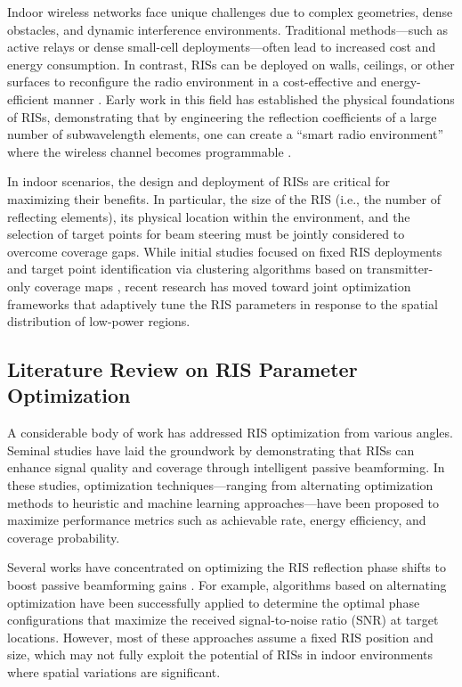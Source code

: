 \documentclass{IEEEoj}
\begin{document}
Indoor wireless networks face unique challenges due to complex geometries, dense obstacles, and dynamic interference environments. Traditional methods—such as active relays or dense small-cell deployments—often lead to increased cost and energy consumption. In contrast, RISs can be deployed on walls, ceilings, or other surfaces to reconfigure the radio environment in a cost-effective and energy-efficient manner \cite{yuan2021reconfigurable, liu2021reconfigurable}. Early work in this field has established the physical foundations of RISs, demonstrating that by engineering the reflection coefficients of a large number of subwavelength elements, one can create a “smart radio environment” where the wireless channel becomes programmable \cite{pan2021reconfigurable}.

In indoor scenarios, the design and deployment of RISs are critical for maximizing their benefits. In particular, the size of the RIS (i.e., the number of reflecting elements), its physical location within the environment, and the selection of target points for beam steering must be jointly considered to overcome coverage gaps. While initial studies focused on fixed RIS deployments and target point identification via clustering algorithms based on transmitter-only coverage maps \cite{emre_claude_eucap_paper}, recent research has moved toward joint optimization frameworks that adaptively tune the RIS parameters in response to the spatial distribution of low-power regions.

\subsection{Literature Review on RIS Parameter Optimization}

A considerable body of work has addressed RIS optimization from various angles. Seminal studies \cite{renzo2020smart, wu2021intelligent} have laid the groundwork by demonstrating that RISs can enhance signal quality and coverage through intelligent passive beamforming. In these studies, optimization techniques—ranging from alternating optimization methods to heuristic and machine learning approaches—have been proposed to maximize performance metrics such as achievable rate, energy efficiency, and coverage probability.

Several works have concentrated on optimizing the RIS reflection phase shifts to boost passive beamforming gains \cite{zhang2021joint, liu2021reconfigurable}. For example, algorithms based on alternating optimization have been successfully applied to determine the optimal phase configurations that maximize the received signal-to-noise ratio (SNR) at target locations. However, most of these approaches assume a fixed RIS position and size, which may not fully exploit the potential of RISs in indoor environments where spatial variations are significant.
\end{document}
